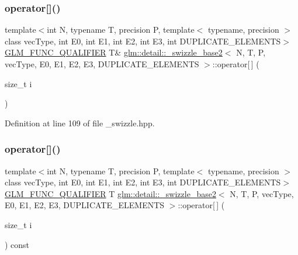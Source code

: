 \subsubsection{\texorpdfstring{operator[]()}{operator[]()}\hspace{0.1cm}{\footnotesize\ttfamily [1/2]}}
{\footnotesize\ttfamily template$<$int N, typename T, precision P, template$<$ typename, precision $>$ class vec\+Type, int E0, int E1, int E2, int E3, int D\+U\+P\+L\+I\+C\+A\+T\+E\+\_\+\+E\+L\+E\+M\+E\+N\+TS$>$ \\
\mbox{\hyperlink{setup_8hpp_a33fdea6f91c5f834105f7415e2a64407}{G\+L\+M\+\_\+\+F\+U\+N\+C\+\_\+\+Q\+U\+A\+L\+I\+F\+I\+ER}} T\& \mbox{\hyperlink{structglm_1_1detail_1_1__swizzle__base2}{glm\+::detail\+::\+\_\+swizzle\+\_\+base2}}$<$ N, T, P, vec\+Type, E0, E1, E2, E3, D\+U\+P\+L\+I\+C\+A\+T\+E\+\_\+\+E\+L\+E\+M\+E\+N\+TS $>$\+::operator\mbox{[}$\,$\mbox{]} (\begin{DoxyParamCaption}\item[{size\+\_\+t}]{i }\end{DoxyParamCaption})\hspace{0.3cm}{\ttfamily [inline]}}



Definition at line 109 of file \+\_\+swizzle.\+hpp.

\mbox{\label{structglm_1_1detail_1_1__swizzle__base2_a32bcfa5111def1015414df50e7f2297f}} 
\subsubsection{\texorpdfstring{operator[]()}{operator[]()}\hspace{0.1cm}{\footnotesize\ttfamily [2/2]}}
{\footnotesize\ttfamily template$<$int N, typename T, precision P, template$<$ typename, precision $>$ class vec\+Type, int E0, int E1, int E2, int E3, int D\+U\+P\+L\+I\+C\+A\+T\+E\+\_\+\+E\+L\+E\+M\+E\+N\+TS$>$ \\
\mbox{\hyperlink{setup_8hpp_a33fdea6f91c5f834105f7415e2a64407}{G\+L\+M\+\_\+\+F\+U\+N\+C\+\_\+\+Q\+U\+A\+L\+I\+F\+I\+ER}} T \mbox{\hyperlink{structglm_1_1detail_1_1__swizzle__base2}{glm\+::detail\+::\+\_\+swizzle\+\_\+base2}}$<$ N, T, P, vec\+Type, E0, E1, E2, E3, D\+U\+P\+L\+I\+C\+A\+T\+E\+\_\+\+E\+L\+E\+M\+E\+N\+TS $>$\+::operator\mbox{[}$\,$\mbox{]} (\begin{DoxyParamCaption}\item[{size\+\_\+t}]{i }\end{DoxyParamCaption}) const\hspace{0.3cm}{\ttfamily [inline]}}



